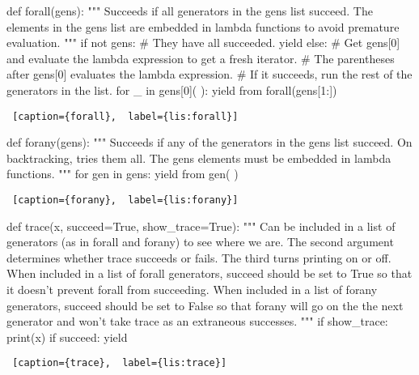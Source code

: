 \noindent
\begin{minipage}{\linewidth}  \largev 
\begin{python}[numbers=left]
def forall(gens):
  """
  Succeeds if all generators in the gens list succeed. The elements in the gens list
  are embedded in lambda functions to avoid premature evaluation.
  """
  if not gens:
    # They have all succeeded.
    yield
  else:
    # Get gens[0] and evaluate the lambda expression to get a fresh iterator.
    # The parentheses after gens[0] evaluates the lambda expression.
    # If it succeeds, run the rest of the generators in the list.
    for _ in gens[0]( ):
      yield from forall(gens[1:])
\end{python}
\begin{lstlisting} [caption={forall},  label={lis:forall}]
\end{lstlisting}
\end{minipage}


\noindent
\begin{minipage}{\linewidth}  \largev 
\begin{python}[numbers=left]
def forany(gens):
  """
  Succeeds if any of the generators in the gens list succeed. On backtracking, tries them all. 
  The gens elements must be embedded in lambda functions.
  """
  for gen in gens:
    yield from gen( )

\end{python}
\begin{lstlisting} [caption={forany},  label={lis:forany}]
\end{lstlisting}
\end{minipage}

\noindent
\begin{minipage}{\linewidth}  \largev 
\begin{python}[numbers=left]
def trace(x, succeed=True, show_trace=True):
  """
  Can be included in a list of generators (as in forall and forany) to see where we are.
  The second argument determines whether trace succeeds or fails. The third turns printing on or off.
  When included in a list of forall generators, succeed should be set to True so that
  it doesn't prevent forall from succeeding.
  When included in a list of forany generators, succeed should be set to False so that forany
  will go on the the next generator and won't take trace as an extraneous successes.
  """
  if show_trace:
    print(x)
  if succeed:
    yield

\end{python}
\begin{lstlisting} [caption={trace},  label={lis:trace}]
\end{lstlisting}
\end{minipage}


